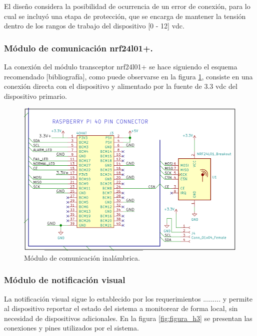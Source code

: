 El diseño considera la posibilidad de ocurrencia de un error de conexión, para lo cual se incluyó una etapa de protección, que se encarga de mantener la tensión dentro de los rangos de trabajo del dispositivo [0 - 12] vdc.

\subsubsection{Módulo de comunicación nrf24l01+.}

La conexión del módulo transceptor nrf24l01+ se hace siguiendo el esquema recomendado [bibliografía], como puede observarse en la figura \ref{fig:figura_g3}, consiste en una conexión directa con el dispositivo y alimentado por la fuente de 3.3 vdc del dispositivo primario.  

\begin{figure}[]
	\centering
	\includegraphics[scale=.25]{./Figures/Capitulo3/Fig_G3.png}
	\caption{Módulo de comunicación inalámbrica.}
	\label{fig:figura_g3}
\end{figure} 

\subsubsection{Módulo de notificación visual}

La notificación visual sigue lo establecido por los requerimientos  ......... y permite al  dispositivo reportar el estado del sistema a monitorear de forma local, sin necesidad de dispositivos adicionales. En la figura \ref{fig:figura_h3} se presentan las conexiones y pines utilizados por el sistema.

